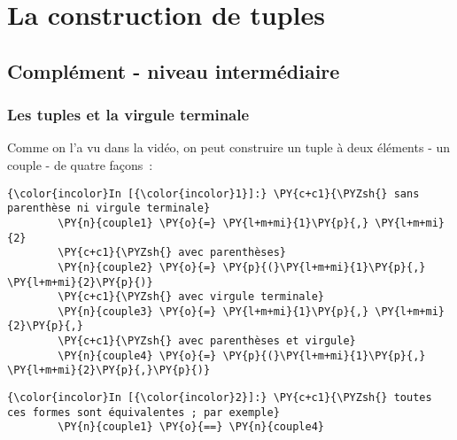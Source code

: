     
    
    
    

    

    \hypertarget{la-construction-de-tuples}{%
\section{La construction de tuples}\label{la-construction-de-tuples}}

    \hypertarget{compluxe9ment---niveau-intermuxe9diaire}{%
\subsection{Complément - niveau
intermédiaire}\label{compluxe9ment---niveau-intermuxe9diaire}}

    \hypertarget{les-tuples-et-la-virgule-terminale}{%
\subsubsection{Les tuples et la virgule
terminale}\label{les-tuples-et-la-virgule-terminale}}

    Comme on l'a vu dans la vidéo, on peut construire un tuple à deux
éléments - un couple - de quatre façons~:

    \begin{Verbatim}[commandchars=\\\{\},frame=single,framerule=0.3mm,rulecolor=\color{cellframecolor}]
{\color{incolor}In [{\color{incolor}1}]:} \PY{c+c1}{\PYZsh{} sans parenthèse ni virgule terminale}
        \PY{n}{couple1} \PY{o}{=} \PY{l+m+mi}{1}\PY{p}{,} \PY{l+m+mi}{2}
        \PY{c+c1}{\PYZsh{} avec parenthèses}
        \PY{n}{couple2} \PY{o}{=} \PY{p}{(}\PY{l+m+mi}{1}\PY{p}{,} \PY{l+m+mi}{2}\PY{p}{)}
        \PY{c+c1}{\PYZsh{} avec virgule terminale}
        \PY{n}{couple3} \PY{o}{=} \PY{l+m+mi}{1}\PY{p}{,} \PY{l+m+mi}{2}\PY{p}{,}
        \PY{c+c1}{\PYZsh{} avec parenthèses et virgule}
        \PY{n}{couple4} \PY{o}{=} \PY{p}{(}\PY{l+m+mi}{1}\PY{p}{,} \PY{l+m+mi}{2}\PY{p}{,}\PY{p}{)}
\end{Verbatim}


    \begin{Verbatim}[commandchars=\\\{\},frame=single,framerule=0.3mm,rulecolor=\color{cellframecolor}]
{\color{incolor}In [{\color{incolor}2}]:} \PY{c+c1}{\PYZsh{} toutes ces formes sont équivalentes ; par exemple}
        \PY{n}{couple1} \PY{o}{==} \PY{n}{couple4}
\end{Verbatim}


